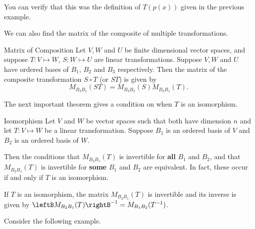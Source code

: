 \begin{solution}
You can verify that this was the definition of $T(p(x))$ given in the previous example.
\end{solution}

We can also find the matrix of the composite of multiple transformations.

\begin{theorem}{Matrix of Composition}\label{thm:matrixcomposition}
Let $V,W$ and $U$ be finite dimensional vector spaces, and suppose $T : V \mapsto W$, $S: W \mapsto U$ are linear transformations. 
Suppose $V, W$ and $U$ have ordered bases of $B_1$, $B_2$ and $B_3$ respectively.  Then the matrix of the composite transformation $S \circ T$ (or $ST$) is given by 
\[ M_{B_3B_1}(ST)=M_{B_3B_2}(S) M_{B_2B_1}(T).\]
\end{theorem}

The next important theorem gives a condition on when $T$ is an isomorphism.

\begin{theorem}{Isomorphism}\label{thm:isomorphism}
Let $V$ and $W$ be vector spaces such that both have dimension $n$ and let $T: V \mapsto W$ be a linear transformation. Suppose $B_1$ is an ordered basis of $V$ and $B_2$ is an ordered basis of $W$. 

 Then the conditions that $M_{B_2B_1}(T)$ is invertible for \textbf{all} $B_1$ and $B_2$, and that $M_{B_2B_1}(T)$ is invertible for \textbf{some} $B_1$ and $B_2$ are equivalent. In fact, these occur if and only if $T$ is an isomorphism. 

If $T$ is an isomorphism, the matrix $M_{B_2B_1}(T)$ is invertible and its inverse is given by $\leftB M_{B_2B_1}(T) \rightB ^{-1} = M_{B_1B_2}(T^{-1})$.
\end{theorem}

Consider the following example.

